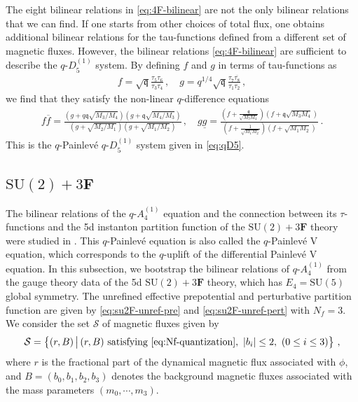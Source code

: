 \documentclass[11pt, a4paper]{article}
\theoremstyle{definition}
\begin{document}
The eight bilinear relations in \eqref{eq:4F-bilinear} are not the only bilinear relations that we can find. If one starts from other choices of total flux, one obtains additional bilinear relations for the tau-functions defined from a different set of magnetic fluxes. However, the bilinear relations \eqref{eq:4F-bilinear} are sufficient to describe the $ q\text{-}D_5^{(1)} $ system. By defining $ f $ and $ g $ in terms of tau-functions as
\begin{align}
    f = \sqrt{\mathfrak{q}} \frac{\tau_5 \tau_6}{\tau_3 \tau_4} \, , \quad
    g = q^{1/4} \sqrt{\mathfrak{q}} \frac{\tau_7 \overline{\tau_8}}{\overline{\tau_1} \tau_2} \, ,
\end{align}
we find that they satisfy the non-linear $ q $-difference equations
\begin{align}
    f\overline{f} = \frac{(g+q\mathfrak{q}\sqrt{M_3/M_4}) (g+\mathfrak{q}\sqrt{M_4/M_3})}{(g + \sqrt{M_2/M_1}) (g+\sqrt{M_1/M_2})} \, , \quad
    g\underline{g} = \frac{(f+\frac{\mathfrak{q}}{\sqrt{M_3M_4}})(f + \mathfrak{q}\sqrt{M_3M_4})}{(f+\frac{1}{\sqrt{M_1M_2}}) (f+\sqrt{M_1M_2})} \, .
\end{align}
This is the $ q $-Painlev\'e $ q\text{-}D_5^{(1)} $ system given in \eqref{eq:qD5}.


\subsection{\texorpdfstring{$ \mathrm{SU}(2) + 3\mathbf{F} $}{SU(2) + 3F}}

The bilinear relations of the $ q\text{-}A_4^{(1)} $ equation and the connection between its $ \tau $-functions and the 5d instanton partition function of the $ \mathrm{SU}(2)+3\mathbf{F} $ theory were studied in \cite{Matsuhira:2018qtx, Bonelli:2022dse}. This $ q $-Painlev\'e equation is also called the $ q $-Painlev\'e V equation, which corresponds to the $ q $-uplift of the differential Painlev\'e V equation. In this subsection, we bootstrap the bilinear relations of $ q\text{-}A_4^{(1)} $ from the gauge theory data of the 5d $ \mathrm{SU}(2)+3\mathbf{F} $ theory, which has $ E_4 = \mathrm{SU}(5) $ global symmetry. The unrefined effective prepotential and perturbative partition function are given by \eqref{eq:su2F-unref-pre} and \eqref{eq:su2F-unref-pert} with $ N_f=3 $. We consider the set $ \mathcal{S} $ of magnetic fluxes given by
\begin{align}
    \mathcal{S} = \left\{ (r,B) \, \big| \, (r,B) \text{ satisfying \eqref{eq:Nf-quantization}}, \ |b_i| \leq 2 , \ (0 \leq i \leq 3) \right\} \, ,
\end{align}
where $ r $ is the fractional part of the dynamical magnetic flux associated with $ \phi $, and $ B=(b_0,b_1,b_2,b_3) $ denotes the background magnetic fluxes associated with the mass parameters $ (m_0,\cdots,m_3) $.
\end{document}

